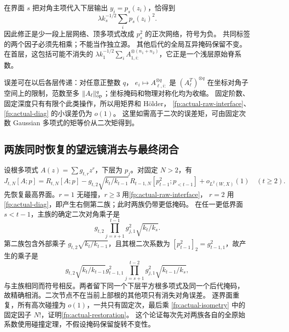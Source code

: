 \documentclass[a4paper]{tufte-handout}
\begin{document}
\begin{fullwidth}
在界面 $s$ 把对角主项代入下层输出 $y_i=p_s(z_i)$，恰得到
\begin{equation}\label{fp:actual-fusion}
 \lambda k_s^{-1/2}\sum_i p_s(z_i)^2.
\end{equation}
因此修正是少一段上层网络、顶多项式改成 $p_s^2$ 的正次网络，符号为负。
共同标签的两个因子必须先相乘；不能当作独立源。
其他后代的全局互异掩码保留不变。
在首层，这包括可能不消失的
$\lambda k_1^{-1/2}\sum_i A_{1,i:}^{\otimes(n_1+n_2)}$，它正是一个浅层原始脊系数。

误差可在以后各层传递：对任意正整数 $q$，
$e_i\mapsto A_{\ell,i:}^{\otimes q}$ 是
$(A_\ell^T)^{\otimes q}$ 在坐标对角子空间上的限制，范数至多
$\|A_\ell\|_{\rm op}^q$；坐标掩码和物理对称化均为收缩。
固定阶数、固定深度只有有限个此类操作，所以用矩界和 Hölder，
\eqref{fp:actual-raw-interface}、\eqref{fp:actual-diag} 的小误差仍为 $o(1)$。
这里如需高于二次的误差矩，可由固定次数 Gaussian 多项式的矩等价从二次矩得到。

\subsection{两族同时恢复的望远镜消去与最终闭合}
\label{fp:actual-telescope}
设根多项式 $A(z)=\sum g_{t,r}z^r$，下层为 $p_j$。对固定 $N>2$，有
\begin{equation}\label{fp:actual-restoration}
 J_{t,N}[A;p]=R_{t,N}[A;p]
 -g_{t,2}\sqrt{k_t/k_{t-1}}\,
 R_{t-1,N}[p_{t-1}^2;p_{<t-1}]+o_{L^2(W,X)}(1)
 \quad(t\geq2).
\end{equation}
先恢复最高界面。$r=1$ 无碰撞，$r\geq3$ 用\eqref{fp:actual-raw-interface}，
$r=2$ 用\eqref{fp:actual-diag}，即产生右侧第二族；此时两族仍带更低掩码。
在任一更低界面 $s<t-1$，主族的确定二次对角乘子是
\[
 g_{t,2}\prod_{j=s+1}^{t-1}g_{j,1}^2\sqrt{k_t/k_s}.
\]
第二族包含外部乘子 $g_{t,2}\sqrt{k_t/k_{t-1}}$，且其根二次系数为
$[p_{t-1}^2]_2=g_{t-1,1}^2$，故产生的乘子是
\[
 g_{t,2}\sqrt{k_t/k_{t-1}}g_{t-1,1}^2
 \prod_{j=s+1}^{t-2}g_{j,1}^2\sqrt{k_{t-1}/k_s},
\]
与主族相同而符号相反。两者留下同一个下层平方根多项式及同一个后代掩码，
故精确相消。二次节点不在当前上部根的其他项只有消失对角误差。
逐界面重复，所有高次碰撞为 $o(1)$，一共只有固定次，最后乘
\eqref{fp:actual-isometry} 中的固定因子 $N!$，证明\eqref{fp:actual-restoration}。
这个论证每次先对两族各自的全原始系数使用碰撞定理，不假设掩码保留旋转不变性。


\end{fullwidth}
\end{document}
